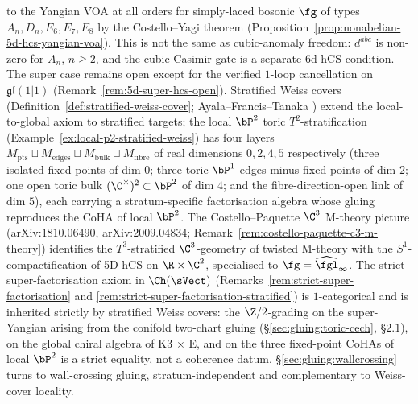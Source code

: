 to the Yangian VOA at all orders for simply-laced bosonic $\fg$ of
types $A_n, D_n, E_6, E_7, E_8$ by the Costello--Yagi theorem
(Proposition~\ref{prop:nonabelian-5d-hcs-yangian-voa}). This is not
the same as cubic-anomaly freedom: $d^{abc}$ is non-zero for
$A_n$, $n \geq 2$, and the cubic-Casimir gate is a separate 6d hCS
condition. The super case remains open except for the verified
$1$-loop cancellation on
$\mathfrak{gl}(1|1)$ (Remark~\ref{rem:5d-super-hcs-open}). Stratified Weiss covers
(Definition~\ref{def:stratified-weiss-cover}; Ayala--Francis--Tanaka
\cite{AyalaFrancisTanaka2017,AyalaFrancisTanaka2017Strat}) extend the
local-to-global axiom to stratified targets; the local $\bP^2$ toric
$T^2$-stratification (Example~\ref{ex:local-p2-stratified-weiss}) has
four layers $M_{\mathrm{pts}} \sqcup M_{\mathrm{edges}} \sqcup
M_{\mathrm{bulk}} \sqcup M_{\mathrm{fibre}}$ of real dimensions
$0, 2, 4, 5$ respectively (three isolated fixed points of dim $0$;
three toric $\bP^1$-edges minus fixed points of dim $2$; one open
toric bulk $(\C^\times)^2 \subset \bP^2$ of dim $4$; and the
fibre-direction-open link of dim $5$), each carrying a stratum-specific
factorisation algebra whose gluing reproduces the CoHA of local
$\bP^2$. The
Costello--Paquette $\C^3$ M-theory picture (arXiv:$1810.06490$,
arXiv:$2009.04834$; Remark~\ref{rem:costello-paquette-c3-m-theory})
identifies the $T^3$-stratified $\C^3$-geometry of twisted M-theory with
the $S^1$-compactification of 5D hCS on $\R \times \C^2$, specialised
to $\fg = \widehat{\fgl}_\infty$. The strict super-factorisation
axiom in $\Ch(\sVect)$
(Remarks~\ref{rem:strict-super-factorisation} and
\ref{rem:strict-super-factorisation-stratified}) is $1$-categorical
and is inherited strictly by stratified Weiss covers: the
$\Z/2$-grading on the super-Yangian arising from the conifold two-chart
gluing (\S\ref{sec:gluing:toric-cech}, \S$2.1$), on the global chiral algebra of
K3 $\times$ E, and on the three fixed-point CoHAs of local $\bP^2$ is
a strict equality, not a coherence datum. \S\ref{sec:gluing:wallcrossing} turns to
wall-crossing gluing, stratum-independent and complementary to
Weiss-cover locality.
